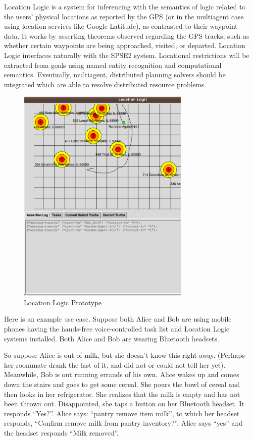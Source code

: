 \documentclass[letterpaper]{article}
\begin{document}
\noindent Location Logic is a system for inferencing with the
semantics of logic related to the users' physical locations as
reported by the GPS (or in the multiagent case using location services
like Google Latitude), as contrasted to their waypoint data.  It works
by asserting theorems observed regarding the GPS tracks, such as
whether certain waypoints are being approached, visited, or departed.
Location Logic interfaces naturally with the SPSE2 system.  Locational
restrictions will be extracted from goals using named entity
recognition and computational semantics.  Eventually, multiagent,
distributed planning solvers should be integrated which are able to
resolve distributed resource problems.

\begin{figure}[h!]
  \centering
  \includegraphics[width=84mm]{images/ps/location-logic.ps}
  \caption{Location Logic Prototype}
\end{figure}

\noindent Here is an example use case.  Suppose both Alice and Bob are
using mobile phones having the hands-free voice-controlled task list
and Location Logic systems installed.  Both Alice and Bob are wearing
Bluetooth headsets.

So suppose Alice is out of milk, but she doesn't know this right away.
(Perhaps her roommate drank the last of it, and did not or could not
tell her yet).  Meanwhile, Bob is out running errands of his own.
Alice wakes up and comes down the stairs and goes to get some cereal.
She pours the bowl of cereal and then looks in her refrigerator.  She
realizes that the milk is empty and has not been thrown out.
Disappointed, she taps a button on her Bluetooth headset.  It responds
``Yes?''.  Alice says: ``pantry remove item milk'', to which her
headset responds, ``Confirm remove milk from pantry inventory?''.
Alice says ``yes'' and the headset responds ``Milk removed''.
\end{document}
